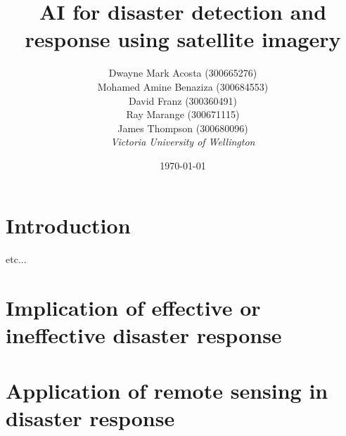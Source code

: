 \documentclass[conference,a4paper]{IEEEtran}
\begin{document}
\newcommand{\cfigure}[2]{%
  \begin{figure}[h]
    \centering
    \texttt{[image: figures/\#1.png]}%
    \caption{#2}%
    \label{fig:#1}%
  \end{figure}%

}
\title{AI for disaster detection and response using satellite imagery}

\author{Dwayne Mark Acosta (300665276) \\ Mohamed Amine Benaziza (300684553) \\ David Franz (300360491) \\ Ray Marange (300671115) \\ James Thompson (300680096)\\
\textit{Victoria University of Wellington}\\}
\date{\today}

\maketitle

\section{Introduction}


\cite{elbohy2025fusion} etc...


\section{Implication of effective or ineffective disaster response}


\section{Application of remote sensing in disaster response}
\end{document}
